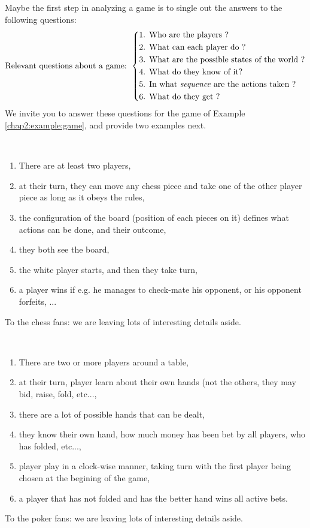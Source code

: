 Maybe the first step in analyzing a game is to single out the answers to the following questions:
\begin{equation*}
\text{Relevant questions about a game: }
\left \{
\begin{aligned}
& \text{{1. Who are the players ?}} \\
& \text{{2. What can each player do ?}} \\
&  \text{{3. What are the possible states of the world ?}}\\
& \text{{4. What do they know of it?}}\\
& \text{{5. In what \emph{sequence} are the actions taken ?}}\\
& \text{{6. What do they get ?}}
\end{aligned} \right.
\end{equation*}
We invite you to answer these questions for the game of Example \ref{chap2:example:game}, and provide two examples next.

\begin{example}
$\,$\\
\begin{enumerate}
\item There are at least two players,
\item at their turn, they can move any chess piece and take one of the other player piece as long as it obeys the rules,
\item the configuration of the board (position of each pieces on it) defines what actions can be done, and their outcome,
\item they both see the board,
\item the white player starts, and then they take turn,
\item a player wins if e.g. he manages to check-mate his opponent, or his opponent forfeits, ...
\end{enumerate}
To the chess fans: we are leaving lots of interesting details aside.
\end{example}
\begin{example}
$\,$\\
\begin{enumerate}
\item There are two or more players around a table,
\item at their turn, player learn about their own hands (not the others, they may bid, raise, fold, etc...,
\item there are a lot of possible hands that can be dealt,
\item they know their own hand, how much money has been bet by all players, who has folded, etc...,
\item player play in a clock-wise manner, taking turn with the first player being chosen at the begining of the game,
\item a player that has not folded and has the better hand wins all active bets.
\end{enumerate}
To the poker fans: we are leaving lots of interesting details aside.
\end{example}


